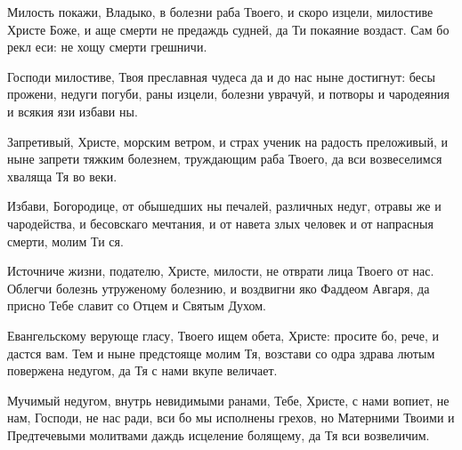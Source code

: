 \begin{mymulticols}




\normalfont{}Милость покажи, Владыко, в болезни раба Твоего, и скоро изцели, милостиве Христе Боже, и аще смерти не предаждь судней, да Ти покаяние воздаст. Сам бо рекл еси: не хощу смерти грешничи.


\normalfont{}Господи милостиве, Твоя преславная чудеса да и до нас ныне достигнут: бесы прожени, недуги погуби, раны изцели, болезни уврачуй, и потворы и чародеяния и всякия язи избави ны.

\slava

Запретивый, Христе, морским ветром, и страх ученик на радость преложивый, и ныне запрети тяжким болезнем, труждающим раба Твоего, да вси возвеселимся хваляща Тя во веки.

\inyne

Избави, Богородице, от обышедших ны печалей, различных недуг, отравы же и чародейства, и бесовскаго мечтания, и от навета злых человек и от напрасныя смерти, молим Ти ся.






\normalfont{}Источниче жизни, подателю, Христе, милости, не отврати лица Твоего от нас. Облегчи болезнь утруженому болезнию, и воздвигни яко Фаддеом Авгаря, да присно Тебе славит со Отцем и Святым Духом.


\normalfont{}Евангельскому верующе гласу, Твоего ищем обета, Христе: просите бо, рече, и дастся вам. Тем и ныне предстояще молим Тя, возстави со одра здрава лютым повержена недугом, да Тя с нами вкупе величает.

\slava

Мучимый недугом, внутрь невидимыми ранами, Тебе, Христе, с нами вопиет, не нам, Господи, не нас ради, вси бо мы исполнены грехов, но Матерними Твоими и Предтечевыми молитвами даждь исцеление болящему, да Тя вси возвеличим.


\end{mymulticols}

